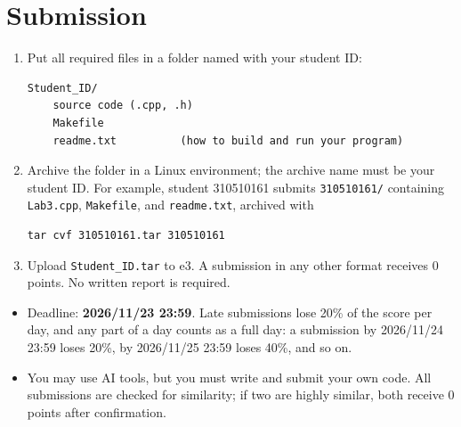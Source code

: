 \documentclass[11pt,a4paper]{article}
\newcommand{\kw}[1]{\texttt{#1}}
\begin{document}
\section{Submission}

\begin{enumerate}
  \item Put all required files in a folder named with your student ID:
\begin{Verbatim}
Student_ID/
    source code (.cpp, .h)
    Makefile
    readme.txt          (how to build and run your program)
\end{Verbatim}
  \item Archive the folder in a Linux environment; the archive name must be
        your student ID. For example, student 310510161 submits
        \kw{310510161/} containing \kw{Lab3.cpp}, \kw{Makefile}, and
        \kw{readme.txt}, archived with
\begin{Verbatim}
tar cvf 310510161.tar 310510161
\end{Verbatim}
  \item Upload \kw{Student\_ID.tar} to e3. A submission in any other format
        receives 0 points. No written report is required.
\end{enumerate}

\begin{itemize}
  \item Deadline: \textbf{2026/11/23 23:59}. Late submissions lose 20\% of
        the score per day, and any part of a day counts as a full day: a
        submission by 2026/11/24 23:59 loses 20\%, by 2026/11/25 23:59 loses
        40\%, and so on.
  \item You may use AI tools, but you must write and submit your own code.
        All submissions are checked for similarity; if two are highly similar,
        both receive 0 points after confirmation.
\end{itemize}
\end{document}
